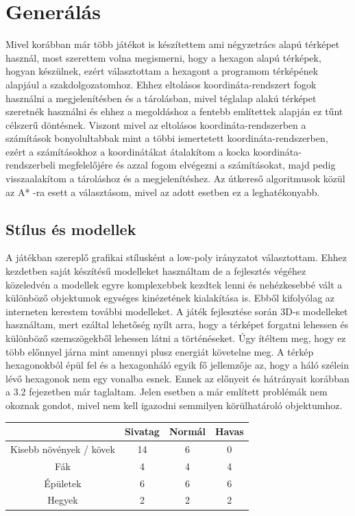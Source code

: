 \chapter{Generálás}

Mivel korábban már több játékot is készítettem ami négyzetrács alapú térképet használ, most szerettem volna megismerni, hogy a hexagon alapú térképek,
 hogyan készülnek, ezért választottam a hexagont a programom térképének alapjául a szakdolgozatomhoz. Ehhez eltolásos koordináta-rendszert fogok használni a megjelenítésben és a tárolásban, mivel téglalap alakú térképet szeretnék használni és ehhez a megoldáshoz a fentebb említettek alapján ez tűnt célszerű döntésnek. Viszont mivel az eltolásos koordináta-rendszerben a számítások bonyolultabbak mint a többi ismertetett koordináta-rendszerben, ezért a számításokhoz a koordinátákat átalakítom a kocka koordináta-rendszerbeli megfelelőjére és azzal fogom elvégezni a számításokat, majd pedig visszaalakítom a tároláshoz és a megjelenítéshez. Az útkereső algoritmusok közül az A* -ra esett a választásom, mivel az adott esetben ez a leghatékonyabb.

\section{Stílus és modellek}

A játékban szereplő grafikai stílusként a low-poly irányzatot választottam. Ehhez kezdetben saját készítésű modelleket használtam de a fejlesztés végéhez közeledvén a modellek egyre komplexebbek kezdtek lenni és nehézkesebbé vált a különböző objektumok egységes kinézetének kialakítása is. Ebből kifolyólag az interneten kerestem további modelleket.
\newline
\newline A játék fejlesztése során 3D-s modelleket használtam, mert ezáltal lehetőség nyílt arra, hogy a térképet forgatni lehessen és különböző szemszögekből lehessen látni a történéseket. Úgy ítéltem meg, hogy ez több előnnyel járna mint amennyi plusz energiát követelne meg.
\newline
\newline A térkép hexagonokból épül fel és a hexagonháló egyik fő jellemzője az, hogy a háló szélein lévő hexagonok nem egy vonalba esnek. Ennek az előnyeit és hátrányait korábban a 3.2 fejezetben már taglaltam. Jelen esetben a már említett problémák nem okoznak gondot, mivel nem kell igazodni semmilyen körülhatároló objektumhoz.

\begin{center}
  \begin{tabular}{ | c | c | c | c | }
    \hline
     & Sivatag & Normál & Havas \\ \hline
    Kisebb növények / kövek & 14 & 6 & 0 \\ \hline
    Fák & 4 & 4 & 4 \\ \hline
    Épületek & 6 & 6 & 6 \\ \hline
    Hegyek & 2 & 2 & 2 \\ \hline
  \end{tabular}
\end{center}

